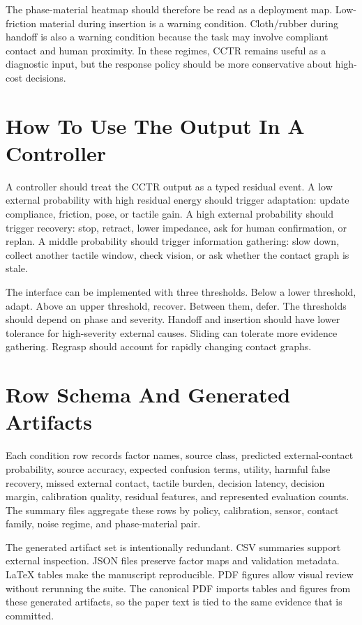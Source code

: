 \documentclass{article}
\newcommand{\method}{CCTR}
\begin{document}
The phase-material heatmap should therefore be read as a deployment map. Low-friction material during insertion is a warning condition. Cloth/rubber during handoff is also a warning condition because the task may involve compliant contact and human proximity. In these regimes, \method{} remains useful as a diagnostic input, but the response policy should be more conservative about high-cost decisions.

\section{How To Use The Output In A Controller}

A controller should treat the \method{} output as a typed residual event. A low external probability with high residual energy should trigger adaptation: update compliance, friction, pose, or tactile gain. A high external probability should trigger recovery: stop, retract, lower impedance, ask for human confirmation, or replan. A middle probability should trigger information gathering: slow down, collect another tactile window, check vision, or ask whether the contact graph is stale.

The interface can be implemented with three thresholds. Below a lower threshold, adapt. Above an upper threshold, recover. Between them, defer. The thresholds should depend on phase and severity. Handoff and insertion should have lower tolerance for high-severity external causes. Sliding can tolerate more evidence gathering. Regrasp should account for rapidly changing contact graphs.

\section{Row Schema And Generated Artifacts}

Each condition row records factor names, source class, predicted external-contact probability, source accuracy, expected confusion terms, utility, harmful false recovery, missed external contact, tactile burden, decision latency, decision margin, calibration quality, residual features, and represented evaluation counts. The summary files aggregate these rows by policy, calibration, sensor, contact family, noise regime, and phase-material pair.

The generated artifact set is intentionally redundant. CSV summaries support external inspection. JSON files preserve factor maps and validation metadata. LaTeX tables make the manuscript reproducible. PDF figures allow visual review without rerunning the suite. The canonical PDF imports tables and figures from these generated artifacts, so the paper text is tied to the same evidence that is committed.
\end{document}
